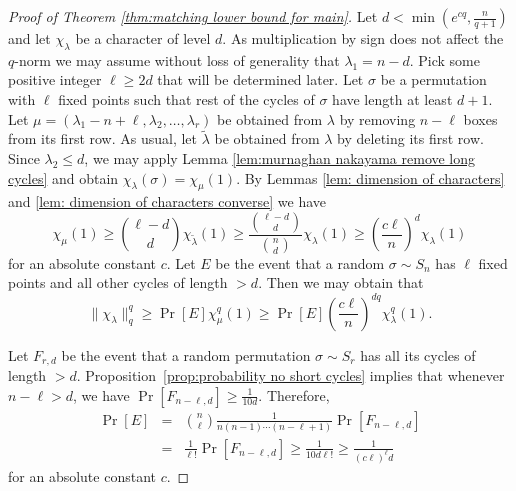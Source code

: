 \documentclass[10pt,a4paper]{amsart}
\renewcommand\ge{\geqslant}
\renewcommand\le{\leqslant}
\newcommand{\remove}[1]{}
\begin{document}
\begin{proof}[Proof of Theorem \ref{thm:matching lower bound for main}]
Let $d < \min(e^{cq},\frac{n}{q+1})$ and let $\chi_{\lambda}$ be a character of level $d$. As multiplication by sign does not affect the $q$-norm we may assume without loss of generality that $\lambda_1 = n-d$. Pick some positive integer $\ell \ge 2d$ that will be determined later. Let $\sigma$ be a permutation with $\ell$ fixed points such that rest of the cycles of $\sigma$ have length at least $d+1$. Let $\mu = (\lambda_1 - n + \ell, \lambda_2, \ldots, \lambda_r)$ be obtained from $\lambda$ by removing $n-\ell$ boxes from its first row. As usual, let $\tilde{\lambda}$ be obtained from $\lambda$ by deleting its first row. Since $\lambda_2 \le d$, we may apply Lemma \ref{lem:murnaghan nakayama remove long cycles} and obtain $\chi_{\lambda}(\sigma) = \chi_{\mu}(1)$.
By Lemmas \ref{lem: dimension of characters} and \ref{lem: dimension of characters converse} we have
\[\chi_{\mu}(1)\ge \binom{\ell-d}{d} \chi_{\tilde{\lambda}}(1)\ge \frac{\binom{\ell-d}{d}}{\binom{n}{d}} \chi_{\lambda}(1)\ge \left(\frac{c\ell}{n}\right)^d \chi_{\lambda}(1)\]
for an absolute constant $c$. Let $E$ be the event that a random $\sigma\sim S_n$ has $\ell$ fixed points and all other cycles of length $>d$. Then we may %
obtain that
\[
\| \chi_{\lambda} \|_q^q \ge \Pr[E] \chi^q_\mu(1) \ge \Pr[E] \left(\frac{c\ell}{n}\right)^{dq}\chi^q_{\lambda}(1). 
\]

Let $F_{r,d}$ be the event that a random permutation $\sigma\sim S_r$ has all its cycles of length $>d$. Proposition~\ref{prop:probability no short cycles} implies that whenever $n-\ell > d$, we have $\Pr[F_{n-\ell,d}]\ge \frac{1}{10d}$. Therefore,
\begin{eqnarray*}
\Pr[E] &=& \binom{n}{\ell}\frac{1}{n(n-1)\cdots (n-\ell +1)}\Pr[F_{n-\ell,d}] \\
       &=& \frac{1}{\ell!}\Pr[F_{n-\ell,d}] \ge \frac{1}{10d \ell!} \ge \frac{1}{ (c\ell)^\ell d}
\end{eqnarray*}
for an absolute constant $c$.

\remove{It therefore remains to lower bound $\Pr[F_{n-l}]$. %
The distribution of the cycle decomposition of a random permutation in $S_r$ is identical to the distribution of a random sequence $(i_1,i_2,\dots)$ obtained by the following process: First choose a random $i_1\sim [r]$, then repeat the process recursively with $r-i_1$ in place of $r$ to obtain $(i_2,\dots)$. This follows easily from the fact that the length of the cycle of the element $r$ is uniform, and that when removing its cycle we get a uniformly random permutation on the remaining elements. 

}
\end{proof}
\end{document}
